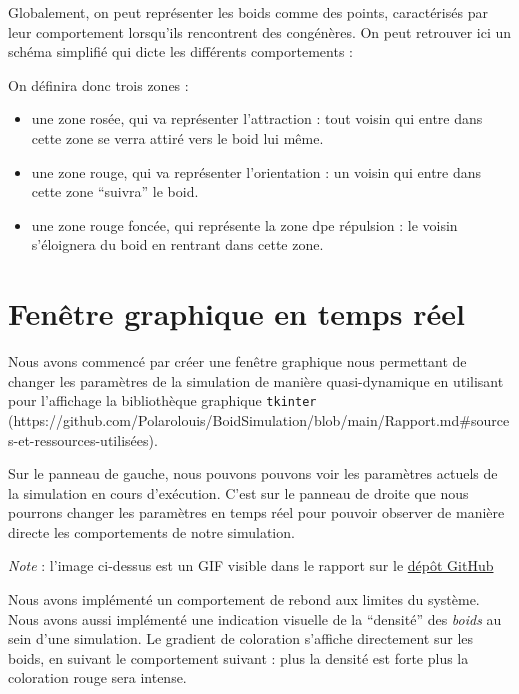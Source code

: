 \documentclass[
]{article}
\providecommand{\tightlist}{%
  \setlength{\itemsep}{0pt}\setlength{\parskip}{0pt}}
\begin{document}
Globalement, on peut représenter les boids comme des points,
caractérisés par leur comportement lorsqu'ils rencontrent des
congénères. On peut retrouver ici un schéma simplifié qui dicte les
différents comportements :

On définira donc trois zones :

\begin{itemize}
\tightlist
\item
  une zone rosée, qui va représenter l'attraction : tout voisin qui
  entre dans cette zone se verra attiré vers le boid lui même.
\item
  une zone rouge, qui va représenter l'orientation : un voisin qui entre
  dans cette zone ``suivra'' le boid.
\item
  une zone rouge foncée, qui représente la zone dpe répulsion : le
  voisin s'éloignera du boid en rentrant dans cette zone.
\end{itemize}

\hypertarget{fenuxeatre-graphique-en-temps-ruxe9el}{%
\section{Fenêtre graphique en temps
réel}\label{fenuxeatre-graphique-en-temps-ruxe9el}}

Nous avons commencé par créer une fenêtre graphique nous permettant de
changer les paramètres de la simulation de manière quasi-dynamique en
utilisant pour l'affichage la bibliothèque graphique \texttt{tkinter}
(https://github.com/Polarolouis/BoidSimulation/blob/main/Rapport.md\#sources-et-ressources-utilisées).

Sur le panneau de gauche, nous pouvons pouvons voir les paramètres
actuels de la simulation en cours d'exécution. C'est sur le panneau de
droite que nous pourrons changer les paramètres en temps réel pour
pouvoir observer de manière directe les comportements de notre
simulation.

\emph{Note} : l'image ci-dessus est un GIF visible dans le rapport sur
le
\href{https://github.com/Polarolouis/BoidSimulation/blob/main/Rapport.md}{dépôt
GitHub}

Nous avons implémenté un comportement de rebond aux limites du système.
Nous avons aussi implémenté une indication visuelle de la ``densité''
des \emph{boids} au sein d'une simulation. Le gradient de coloration
s'affiche directement sur les boids, en suivant le comportement suivant
: plus la densité est forte plus la coloration rouge sera intense.
\end{document}
